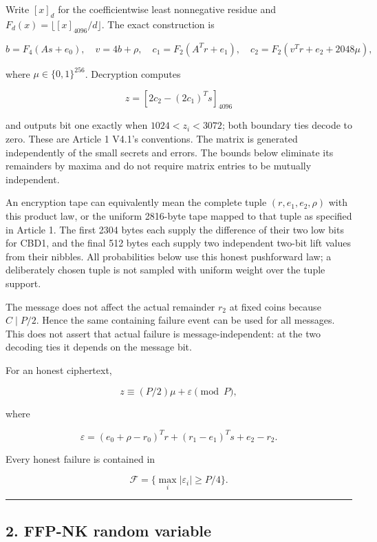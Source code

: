 \documentclass[11pt,a4paper]{article}
\begin{document}
Write \([x]_d\) for the coefficientwise least nonnegative residue and \(F_d(x)=\lfloor[x]_{4096}/d\rfloor\). The exact construction is

\[
b=F_4(As+e_0),\quad v=4b+\rho,\quad
c_1=F_2(A^Tr+e_1),\quad
c_2=F_2(v^Tr+e_2+2048\mu),
\]

where \(\mu\in\{0,1\}^{256}\). Decryption computes

\[
z=[2c_2-(2c_1)^Ts]_{4096}
\]

and outputs bit one exactly when \(1024<z_i<3072\); both boundary ties decode to zero. These are Article 1 V4.1's conventions. The matrix is generated independently of the small secrets and errors. The bounds below eliminate its remainders by maxima and do not require matrix entries to be mutually independent.

An encryption tape can equivalently mean the complete tuple \((r,e_1,e_2,\rho)\) with this product law, or the uniform 2816-byte tape mapped to that tuple as specified in Article 1. The first 2304 bytes each supply the difference of their two low bits for CBD1, and the final 512 bytes each supply two independent two-bit lift values from their nibbles. All probabilities below use this honest pushforward law; a deliberately chosen tuple is not sampled with uniform weight over the tuple support.

The message does not affect the actual remainder \(r_2\) at fixed coins because \(C\mid P/2\). Hence the same containing failure event can be used for all messages. This does not assert that actual failure is message-independent: at the two decoding ties it depends on the message bit.

For an honest ciphertext,

\[
z\equiv(P/2)\mu+\varepsilon\pmod P,
\]

where

\[
\varepsilon=(e_0+\rho-r_0)^Tr+(r_1-e_1)^Ts+e_2-r_2.
\]

Every honest failure is contained in

\[
\mathcal F=\{\max_i|\varepsilon_i|\ge P/4\}.
\]

\begin{center}\rule{0.5\linewidth}{0.5pt}\end{center}

\subsection{2. FFP-NK random variable}\label{ffp-nk-random-variable}
\end{document}
